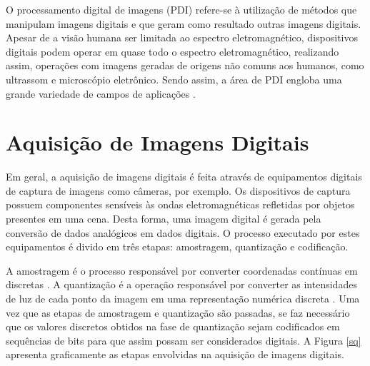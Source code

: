 O processamento digital de imagens (PDI) refere-se à utilização de métodos que manipulam imagens digitais e que geram como resultado outras imagens digitais. Apesar de a visão humana ser limitada ao espectro eletromagnético, dispositivos digitais podem operar em quase todo o espectro eletromagnético, realizando assim, operações com imagens geradas de origens não comuns aos humanos, como ultrassom e microscópio eletrônico. Sendo assim, a área de PDI engloba uma grande variedade de campos de aplicações \cite{Gonzalez:2006:DIP:1076432}.

\section{Aquisição de Imagens Digitais}
Em geral, a aquisição de imagens digitais é feita através de equipamentos digitais de captura de imagens como câmeras, por exemplo. Os dispositivos de captura possuem componentes sensíveis às ondas eletromagnéticas refletidas por objetos presentes em uma cena. Desta forma, uma imagem digital é gerada pela conversão de  dados analógicos em dados digitais. O processo executado por estes equipamentos é divido em três etapas: amostragem, quantização e codificação.

A amostragem é o processo responsável por converter coordenadas contínuas em  discretas \cite{albovik}. A quantização é a operação responsável por converter as intensidades de luz de cada ponto da imagem em uma representação numérica discreta \cite{widrow}. Uma vez que as etapas de amostragem e quantização são passadas, se faz necessário que os valores discretos obtidos na fase de quantização sejam codificados em sequências de bits para que assim possam ser considerados digitais. A Figura \ref{sq} apresenta graficamente as etapas envolvidas na aquisição de imagens digitais.


